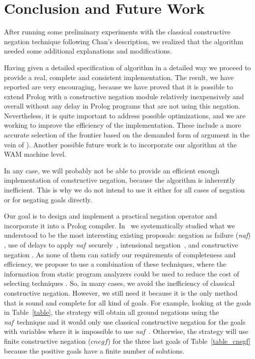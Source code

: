 \documentclass{llncs}
\newcommand{\naf}{{\em naf}}\newcommand{\viejo}[1]{}
\begin{document}

\section{Conclusion and Future Work}
\label{conclusion}
After running some preliminary experiments with the classical constructive 
negation technique  following Chan's description, we realized that the
algorithm needed some additional explanations and modifications.

Having given a detailed specification of algorithm in a detailed way
we proceed to provide a real, complete and consistent
implementation. The result, we have reported are very encouraging,
because we have proved that it is possible to extend Prolog with a
constructive negation module relatively inexpensively and overall
without any delay in Prolog programs that are not using this
negation. Nevertheless, it is quite important to address possible
optimizations, and we are working to improve the efficiency of the
implementation. These include a more accurate selection of the
frontier based on the demanded form of argument in the vein of
\cite{Moreno2}). Another possible future work is to incorporate our algorithm
at the WAM machine level.

In any case, we will probably not be able to provide an efficient enough
implementation of constructive negation, because the algorithm is
inherently inefficient.  This is why we do not intend to
use it either for all cases of negation or for negating goals
directly.

Our goal is to design and implement a practical negation operator and
incorporate it into a Prolog compiler.
In~\cite{SusanaPADL2000,SusanaLPAR01} we systematically studied what
we understood to be the most interesting existing proposals: negation
as failure (\naf) \cite{Clark}, use of delays to apply \naf\
securely~\cite{naish:lncs}, intensional
negation~\cite{Barbuti1,Barbuti2}, and constructive negation
\cite{Chan1,Chan2,Drabent,Stuckey,Stuckey95}. As none of them can
satisfy our requirements of completeness and efficiency, we propose to
use a combination of these techniques, where the information from
static program analyzers could be used to reduce the cost of selecting
techniques \cite{SusanaLPAR01}. So, in many cases, we avoid the
inefficiency of classical constructive negation. However, we still
need it because it is the only method that is sound and complete for
all kind of goals. For example, looking at the goals in
Table~\ref{table}, the strategy will obtain all ground negations using
the \naf\ technique and it would only use classical constructive
negation for the goals with variables where it is impossible to use
\naf\ . Otherwise, the strategy will use finite constructive negation
($cnegf$) for the three last goals of Table~\ref{table_cnegf} because
the positive goals have a finite number of solutions.
\end{document}
